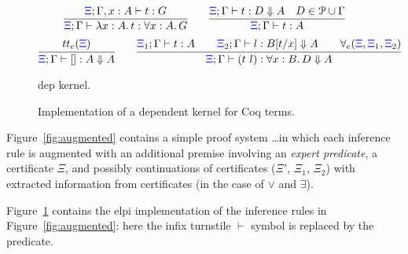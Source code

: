 \begin{footnotesize}
\begin{figure}
    \newcommand{\XXi}{{\color{blue}{\Xi}}}

  \newcommand{\bc}[5]{#1;#2\vdash #3 : #4 \Downarrow #5}
\[
\infer{\XXi;\Gamma\vdash \lambda x:A.\,t : \forall x : A.\,  G}
{\XXi;\Gamma, x : A\vdash t : G%
}
\qquad
\infer{\XXi;\Gamma\vdash t : A}
      {\bc{\XXi}{\Gamma} t D A \quad D \in \Pscr\cup\Gamma}
\]
\vskip -18pt
\[
  \infer{\bc {\XXi}{\Gamma} {[]} A A}{\trueExpert{\XXi}}{}\qquad
  \infer{\bc{\XXi}{\Gamma}{(t\ l)} {\forall x:B.\, D} A}
  {\XXi_1;\Gamma\vdash t : A\qquad \bc{\XXi_2}{\Gamma}l {B[t/x]} A\qquad\prodExpert{\XXi}{\XXi_1}{\XXi_2}}{}
\]
%
\caption{dep kernel.}
\label{fig:augmented}
%

\caption{Implementation of a  dependent kernel for Coq terms.}
\label{fig:kernel}
\end{figure}
\end{footnotesize}



Figure~\ref{fig:augmented} contains a simple proof system \dots  in which each inference rule is augmented with an
additional premise involving an \emph{expert predicate}, a
certificate $\Xi$, and possibly continuations of certificates ($\Xi'$,
$\Xi_1$, $\Xi_2$) with extracted information from certificates (in the
case of $\vee$ and $\exists$).
%
%
%

Figure~\ref{fig:kernel} contains the elpi implementation of the
inference rules in Figure~\ref{fig:augmented}: here the infix
turnstile $\vdash$ symbol is replaced by the  predicate.
%

